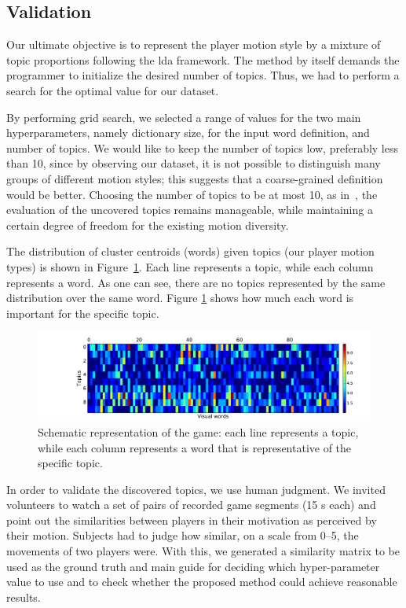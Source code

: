 \subsection{Validation}

Our ultimate objective is to represent the player motion style by a mixture of topic proportions following the \gls{lda} framework. The method by itself demands the programmer to initialize the desired number of topics. Thus, we had to perform a search for the optimal value for our dataset.

By performing grid search, we selected a range of values for the two main hyperparameters, namely dictionary size, for the input word definition, and number of topics. We would like to keep the number of topics low, preferably less than 10, since by observing our dataset, it is not possible to distinguish many groups of different motion styles; this suggests that a coarse-grained definition would be better. Choosing the number of topics to be at most 10, as in~\cite{smith_mining_2016}, the evaluation of the uncovered topics remains manageable, while maintaining a certain degree of freedom for the existing motion diversity.

The distribution of cluster centroids (words) given topics (our player motion types) is shown in Figure~\ref{fig:overall_game}.
Each line represents a topic, while each column represents a word. As one can see, there are no topics represented by the same distribution over the same word. Figure \ref{fig:overall_game} shows how much each word is important for the specific topic.

\begin{figure}[h]
	\centering
	\includegraphics[width=\textwidth]{images/05-modeling/lda_heatmap}
	\caption{Schematic representation of the game: each line represents a topic, while each column represents a word that is representative of the specific topic.}
  \label{fig:overall_game}
\end{figure}

In order to validate the discovered topics, we use human judgment. We invited volunteers to watch a set of pairs of recorded game segments (15 s each) and point out the similarities between players in their motivation as perceived by their motion. Subjects had to judge how similar, on a scale from 0--5, the movements of two players were. With this, we generated a similarity matrix to be used as the ground truth and main guide for deciding which hyper-parameter value to use and to check whether the proposed method could achieve reasonable results.

